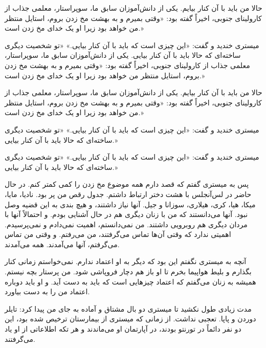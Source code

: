 حالا من باید با آن کنار بیایم. یکی از دانش‌آموزان سابق ما، سوپراستار، معلمی جذاب از کارولینای جنوبی، اخیراً گفته بود: «وقتی بمیرم و به بهشت مخ زدن بروم، استایل منتظر من خواهد بود زیرا او یک خدای مخ زدن است.»

میستری خندید و گفت: «این چیزی است که باید با آن کنار بیایی.» «تو شخصیت دیگری ساخته‌ای که حالا باید با آن کنار بیایی. یکی از دانش‌آموزان سابق ما، سوپراستار، معلمی جذاب از کارولینای جنوبی، اخیراً گفته بود: «وقتی بمیرم و به بهشت مخ زدن بروم، استایل منتظر من خواهد بود زیرا او یک خدای مخ زدن است.»

حالا من باید با آن کنار بیایم. یکی از دانش‌آموزان سابق ما، سوپراستار، معلمی جذاب از کارولینای جنوبی، اخیراً گفته بود: «وقتی بمیرم و به بهشت مخ زدن بروم، استایل منتظر من خواهد بود زیرا او یک خدای مخ زدن است.»

میستری خندید و گفت: «این چیزی است که باید با آن کنار بیایی.» «تو شخصیت دیگری ساخته‌ای که حالا باید با آن کنار بیایی.»

میستری خندید و گفت: «این چیزی است که باید با آن کنار بیایی.» «تو شخصیت دیگری ساخته‌ای که حالا باید با آن کنار بیایی.»

پس به میستری گفتم که قصد دارم همه موضوع مخ زدن را کمی کمتر کنم. در حال حاضر در لس‌آنجلس با هشت دختر ارتباط داشتم. جدول رقص من پر بود. نادیا، مایا، میکا، هیا، کری، هیلاری، سوزانا و جیل. آنها نیاز داشتند، و هیچ بندی به این قضیه وصل نبود. آنها می‌دانستند که من با زنان دیگری هم در حال آشنایی بودم. و احتمالاً آنها با مردان دیگری هم روبرویی داشتند. من نمی‌دانستم، اهمیت نمی‌دادم و نمی‌پرسیدم. اهمیتی ندارد که وقتی آن‌ها تماس می‌گرفتند، من می‌رفتم. و وقتی من تماس می‌گرفتم، آنها می‌آمدند. همه می‌آمدند.

آنچه به میستری نگفتم این بود که دیگر به او اعتماد ندارم. نمی‌خواستم زمانی کنار بگذارم و بلیط هواپیما بخرم تا او باز هم دچار فروپاشی شود. من پرستار بچه نیستم. همیشه به زنان می‌گفتم که اعتماد چیزهایی است که باید به دست آید. و او باید دوباره اعتماد من را به دست بیاورد.

مدت زیادی طول نکشید تا میستری دو بال مشتاق و آماده‌ به جای من پیدا کرد: تایلر دوردن و پاپا. تعجبی نداشت. از زمانی که میستری از بیمارستان ترخیص شده بود، این دو نفر دائماً در تورنتو بودند، در آپارتمان او می‌ماندند و هر تکه اطلاعاتی از او یاد می‌گرفتند.